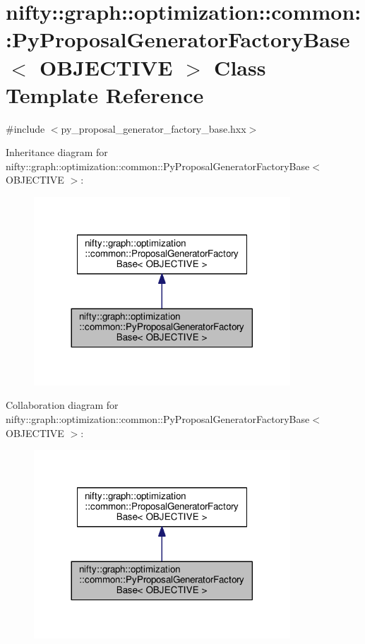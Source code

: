 \hypertarget{classnifty_1_1graph_1_1optimization_1_1common_1_1PyProposalGeneratorFactoryBase}{}\section{nifty\+:\+:graph\+:\+:optimization\+:\+:common\+:\+:Py\+Proposal\+Generator\+Factory\+Base$<$ O\+B\+J\+E\+C\+T\+I\+V\+E $>$ Class Template Reference}
\label{classnifty_1_1graph_1_1optimization_1_1common_1_1PyProposalGeneratorFactoryBase}


{\ttfamily \#include $<$py\+\_\+proposal\+\_\+generator\+\_\+factory\+\_\+base.\+hxx$>$}



Inheritance diagram for nifty\+:\+:graph\+:\+:optimization\+:\+:common\+:\+:Py\+Proposal\+Generator\+Factory\+Base$<$ O\+B\+J\+E\+C\+T\+I\+V\+E $>$\+:\nopagebreak
\begin{figure}[H]
\begin{center}
\leavevmode
\includegraphics[width=272pt]{classnifty_1_1graph_1_1optimization_1_1common_1_1PyProposalGeneratorFactoryBase__inherit__graph}
\end{center}
\end{figure}


Collaboration diagram for nifty\+:\+:graph\+:\+:optimization\+:\+:common\+:\+:Py\+Proposal\+Generator\+Factory\+Base$<$ O\+B\+J\+E\+C\+T\+I\+V\+E $>$\+:\nopagebreak
\begin{figure}[H]
\begin{center}
\leavevmode
\includegraphics[width=272pt]{classnifty_1_1graph_1_1optimization_1_1common_1_1PyProposalGeneratorFactoryBase__coll__graph}
\end{center}
\end{figure}
